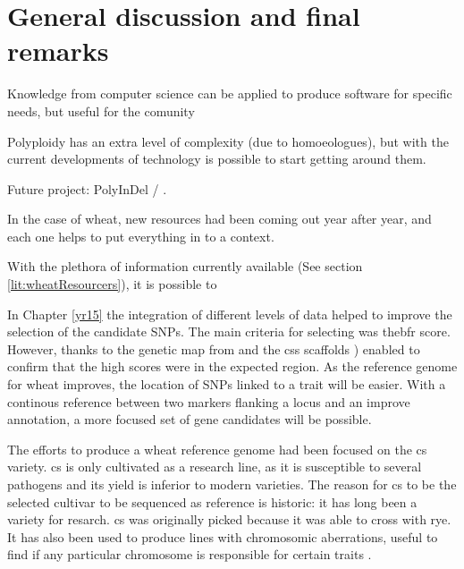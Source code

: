 
\chapter{General discussion and final remarks}




Knowledge from  computer science can be applied to produce software for specific needs, but useful for the comunity

Polyploidy has an extra level of complexity (due to homoeologues), but with the current developments of technology is possible to start getting around them. 

Future project: PolyInDel / . 

In the case of wheat, new resources had been coming out year after year, and each one helps to put everything in to a context. 

With the plethora of information currently available (See section \ref{lit:wheatResourcers}), it is possible to 


In Chapter \ref{yr15} the integration of different levels of data helped to improve the selection of the candidate SNPs. 
The main criteria for selecting   was the\acrshort{bfr} score.
However, thanks to the genetic map from \citet{Wang2014} and the \acrshort{css} scaffolds \citep{Mayer2014}) enabled to confirm that the high scores were in the expected region. 
As the reference genome for wheat improves, the location of SNPs linked to a trait will be easier. 
With a continous reference between two markers flanking a locus and an improve annotation, a more focused set of gene candidates will be possible. 


The efforts to produce a wheat reference genome had been focused on the \gls{cs} variety. 
\acrshort{cs} is only cultivated as a research line, as it is susceptible to several pathogens and its yield is inferior to modern varieties.  
The reason for \acrshort{cs} to be the selected cultivar to be sequenced as reference is historic: it has long been a variety  for resarch.
\acrshort{cs} was originally picked because it was able to cross with rye. 
It has also been used to produce lines with chromosomic aberrations, useful to find if any particular chromosome is responsible for certain traits \citep{Sears1985}. 


